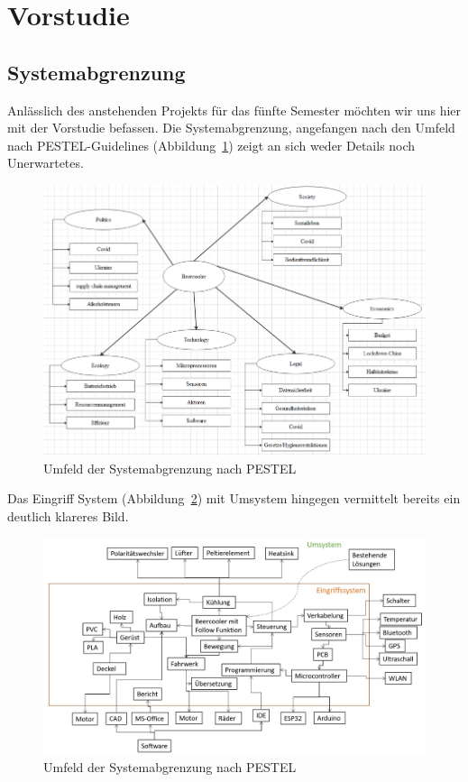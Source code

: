 \section{Vorstudie}

\subsection{Systemabgrenzung}

Anlässlich des anstehenden Projekts für das fünfte Semester möchten wir uns 
hier mit der Vorstudie befassen. Die Systemabgrenzung, angefangen nach den Umfeld
nach PESTEL-Guidelines (Abbildung~\ref{fig:pestel}) zeigt an sich weder Details 
noch Unerwartetes.

\begin{figure}[h]
\begin{center}
\includegraphics[width=\linewidth]{graphics/pestel.png}
\end{center}
\caption{Umfeld der Systemabgrenzung nach PESTEL}
\label{fig:pestel}
\end{figure}

\pagebreak

Das Eingriff System (Abbildung~\ref{fig:systemabgrenzung}) mit Umsystem hingegen 
vermittelt bereits ein deutlich klareres Bild.

\begin{figure}[h]
\begin{center}
\includegraphics[width=\linewidth]{graphics/systemabgrenzung.jpg}
\end{center}
\caption{Umfeld der Systemabgrenzung nach PESTEL}
\label{fig:systemabgrenzung}
\end{figure}


